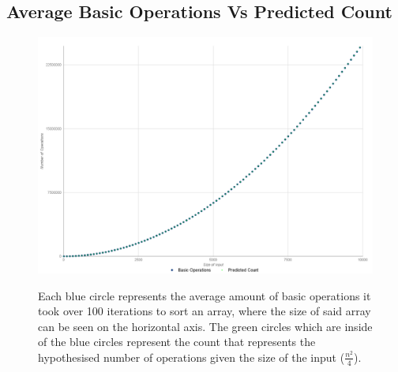 \documentclass[12pt]{article}
\begin{document}
\begin{appendices}
\newpage


\section{Average Basic Operations Vs Predicted Count}
\begin{figure}[h]
	\centering
	\includegraphics[scale=0.2]{AverageBasicOperationsVAssumedCount}\\[.1cm]
	\caption{\label{AverageBasicOperationsVAssumedCount} Each blue circle represents the average amount of basic operations it took over 100 iterations to sort an array, where the size of said array can be seen on the horizontal axis. The green circles which are inside of the blue circles represent  the count that represents the hypothesised number of operations given the size of the input  ($\frac{n^2}{4}$).}
\end{figure}

\newpage


\end{appendices}
\end{document}
